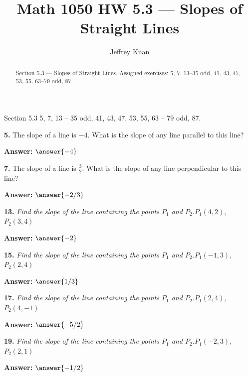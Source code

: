 \documentclass{ximera}
\author{Jeffrey Kuan}
\title{Math 1050 HW 5.3 --- Slopes of Straight Lines}
\begin{document}
\begin{abstract}
    Section 5.3 --- Slopes of Straight Lines.
    Assigned exercises: 5, 7, 13–35 odd, 41, 43, 47, 53, 55, 63–79 odd, 87.
\end{abstract}

\maketitle

Section 5.3 5, 7, 13 – 35 odd, 41, 43, 47, 53, 55, 63 – 79 odd, 87.

\begin{problem}
\textbf{5.} The slope of a line is $-4$. What is the slope of any line parallel to this line?

\textbf{Answer:} $\answer{-4}$
\end{problem}

\begin{problem}
\textbf{7.} The slope of a line is $\frac{3}{2}$. What is the slope of any line perpendicular
  to this line?

\textbf{Answer:} $\answer{-2/3}$
\end{problem}

\begin{problem}
\textbf{13.} \emph{Find the slope of the line containing the points $P_1$ and $P_2$.}\quad $P_1(4, 2)$, $P_2(3, 4)$

\textbf{Answer:} $\answer{-2}$
\end{problem}

\begin{problem}
\textbf{15.} \emph{Find the slope of the line containing the points $P_1$ and $P_2$.}\quad $P_1(-1, 3)$, $P_2(2, 4)$

\textbf{Answer:} $\answer{1/3}$
\end{problem}

\begin{problem}
\textbf{17.} \emph{Find the slope of the line containing the points $P_1$ and $P_2$.}\quad $P_1(2, 4)$, $P_2(4, -1)$

\textbf{Answer:} $\answer{-5/2}$
\end{problem}

\begin{problem}
\textbf{19.} \emph{Find the slope of the line containing the points $P_1$ and $P_2$.}\quad $P_1(-2, 3)$, $P_2(2, 1)$

\textbf{Answer:} $\answer{-1/2}$
\end{problem}
\end{document}
